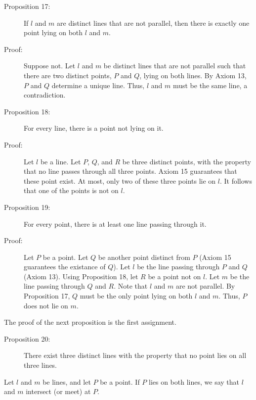 \documentclass{article}
\begin{document}
\begin{description}

\item[Proposition 17:] If $l$ and $m$ are distinct lines that are not parallel, then there is exactly one point lying on both $l$ and $m$.

\item[Proof:] Suppose not. Let $l$ and $m$ be distinct lines that are not parallel such that there are two distinct points, $P$ and $Q$, lying on both lines. By Axiom 13, $P$ and $Q$ determine a unique line. Thus, $l$ and $m$ must be the same line, a contradiction.

\item[Proposition 18:] For every line, there is a point not lying on it.

\item[Proof:] Let $l$ be a line. Let $P$, $Q$, and $R$ be three distinct points, with the property that no line passes through all three points. Axiom 15 guarantees that these point exist. At most, only two of these three points lie on $l$. It follows that one of the points is not on $l$.

\item[Proposition 19:] For every point, there is at least one line passing through it.

\item[Proof:] Let $P$ be a point. Let $Q$ be another point distinct from $P$ (Axiom 15 guarantees the existance of $Q$). Let $l$ be the line passing through $P$ and $Q$ (Axiom 13). Using Proposition 18, let $R$ be a point not on $l$. Let $m$ be the line passing through $Q$ and $R$. Note that $l$ and $m$ are not parallel. By Proposition 17, $Q$ must be the only point lying on both $l$ and $m$. Thus, $P$ does not lie on $m$.

\end{description}

The proof of the next proposition is the first assignment.

\begin{description}

\item[Proposition 20:] There exist three distinct lines with the property that no point lies on all three lines.

\end{description}

Let $l$ and $m$ be lines, and let $P$ be a point. If $P$ lies on both lines, we say that $l$ and $m$ intersect (or meet) at $P$.
\end{document}
